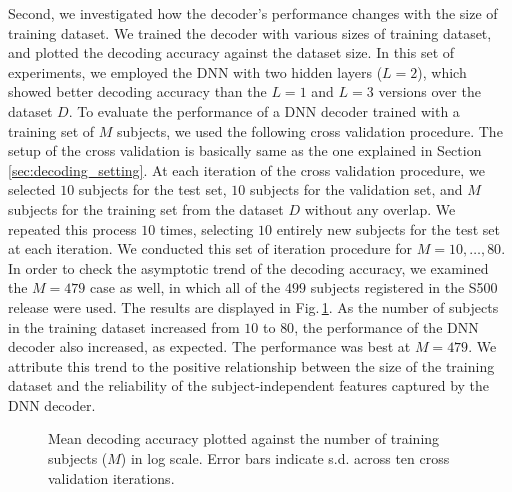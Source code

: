 Second, we investigated how the decoder's performance changes with the size of training dataset.
We trained the decoder with various sizes of training dataset, and plotted the decoding accuracy against the dataset size.
In this set of experiments, we employed the DNN with two hidden layers ($L = 2$),
which showed better decoding accuracy than the $L = 1$ and $L = 3$ versions over the dataset $D$.
To evaluate the performance of a DNN decoder trained with a training set of $M$ subjects,
we used the following cross validation procedure.
The setup of the cross validation is basically same as the one explained in Section\,\ref{sec:decoding_setting}.
%
At each iteration of the cross validation procedure, we selected $10$ subjects for the test set, $10$ subjects for the validation set, and $M$ subjects for the training set from the dataset $D$ without any overlap.
%
We repeated this process $10$ times, selecting $10$ entirely new subjects for the test set at each iteration.
%
We conducted this set of iteration procedure for $M = 10, \dots, 80$.
%
In order to check the asymptotic trend of the decoding accuracy, we examined the $M = 479$ case as well, in which all of the $499$ subjects registered in the S500 release were used.
The results are displayed in Fig.\,\ref{fig:change_n}.
As the number of subjects in the training dataset increased from $10$ to $80$, the performance of the DNN decoder also increased, as expected.
%
The performance was best at $M = 479$.
%
We attribute this trend to the positive relationship between the size of the training dataset and the reliability of the subject-independent features captured by the DNN decoder.
%
\begin{figure}[thbp]
\begin{center}
\caption{\label{fig:change_n}
Mean decoding accuracy plotted against the number of training subjects ($M$) in log scale.
Error bars indicate s.d. across ten cross validation iterations.}
\end{center}
\end{figure}
%

